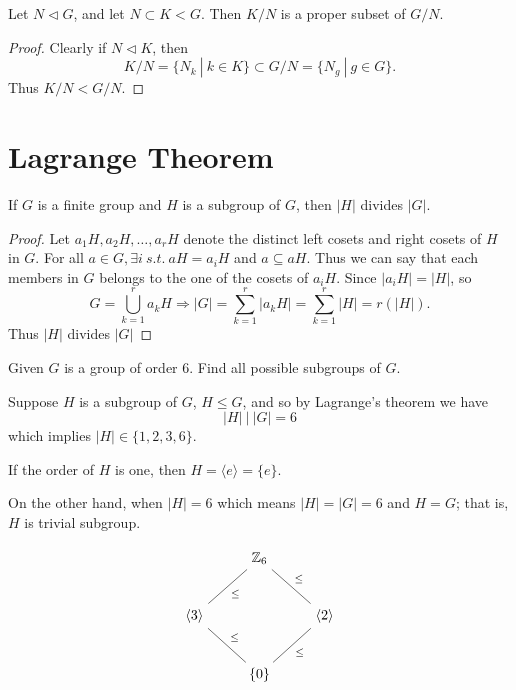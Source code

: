 \begin{theorem}
    Let $N \triangleleft G$, and let $N \subset K < G$. Then $K/N$ is a proper subset of $G/N$.
\end{theorem}
\begin{proof}
    Clearly if $N \triangleleft K$, then 
    \[
        K/N = \{ N_k \> | \> k \in K \} \subset G/N =\{ N_g \> | \> g \in G \}.
    \]
    Thus $K/N < G/N$.
\end{proof}

\section{Lagrange Theorem}

\begin{theorem}
    If $G$ is a finite group and $H$ is a subgroup of $G$, then $|H|$ divides $|G|$.
\end{theorem}
\begin{proof}
    Let $a_1H, a_2H, \ldots, a_rH$ denote the distinct left cosets and right cosets of $H$ in $G$. 
    For all $a \in G, \exists i \> s.t. \> aH =a_iH$ and $a \subseteq aH$. Thus we can say that each members in $G$ 
    belongs to the one of the cosets of $a_iH$. Since $|a_iH| = |H|$, so
    \[
        G = \bigcup^r_{k=1} a_kH \Longrightarrow |G| = \sum^{r}_{k=1} |a_kH| = \sum^{r}_{k=1} |H| = r(|H|).
    \]
    Thus $|H|$ divides $|G|$
\end{proof}

\begin{example}
    Given $G$ is a group of order 6. Find all possible subgroups of $G$.
\end{example}
\begin{solution}
    Suppose $H$ is a subgroup of $G$, $H \leq G$, and so by Lagrange's theorem we have 
    \[
        |H| \> \big \vert \> |G| = 6
    \]
    which implies $|H| \in \{1, 2, 3, 6\}$.

    If the order of $H$ is one, then $H = \langle e \rangle = \{ e \}$.

    On the other hand, when $|H| = 6$ which means $|H| = |G| = 6$ and $H = G$; that is, $H$ is trivial subgroup.

    \[
        \begin{tikzcd}[row sep=2.5em]
            & \mathbb{Z}_6 \arrow[dash, "\leq"]{dl} \arrow[dash, "\leq"]{dr} & \\
            \langle 3 \rangle \arrow[dash, "\leq"]{dr}&  & \langle 2 \rangle \arrow[dash, "\leq"]{dl}\\
            & \{ 0 \} &\\
        \end{tikzcd}
    \]
\end{solution}

